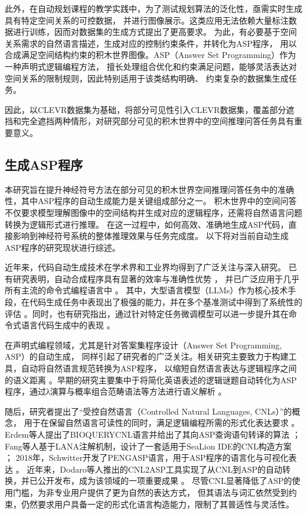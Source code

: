 此外，在自动规划课程的教学实践中，为了测试规划算法的泛化性，亟需实时生成具有特定空间关系的可控数据，
并进行图像展示。这类应用无法依赖大量标注数据进行训练，因而对数据集的生成方式提出了更高要求。
为此，有必要基于空间关系需求的自然语言描述，生成对应的控制约束条件，并转化为ASP程序，
用以合成满足空间结构约束的积木世界图像。ASP（Answer Set Programming）作为一种声明式逻辑编程方法，
擅长处理组合优化和约束满足问题，能够灵活表达对空间关系的限制规则，因此特别适用于该类结构明确、
约束复杂的数据集生成任务。

因此，以CLEVR数据集为基础，将部分可见性引入CLEVR数据集，覆盖部分遮挡和完全遮挡两种情形，对研究部分可见的积木世界中的空间推理问答任务具有重要意义。
\subsection{生成ASP程序}
本研究旨在提升神经符号方法在部分可见的积木世界空间推理问答任务中的准确性，其中ASP程序的自动生成能力是关键组成部分之一。
积木世界中的空间问答不仅要求模型理解图像中的空间结构并生成对应的逻辑程序，还需将自然语言问题转换为逻辑形式进行推理。
在这一过程中，如何高效、准确地生成ASP代码，直接影响到神经符号系统的整体推理效果与任务完成度。
以下将对当前自动生成ASP程序的研究现状进行综述。

近年来，代码自动生成技术在学术界和工业界均得到了广泛关注与深入研究。
已有研究表明，自动合成程序具有显著的效率与准确性优势 \cite{ernst2022ai}\cite{peng2023impact}\cite{dakhel2023github}，
并已广泛应用于几乎所有主流的命令式编程语言中 \cite{chen2021evaluating}。
其中，大型语言模型（LLMs）作为核心技术手段，在代码生成任务中表现出了极强的能力，并在多个基准测试中得到了系统性的评估 \cite{xu2022systematic}\cite{wang2023codet5+}。同时，也有研究指出，通过针对特定任务微调模型可以进一步提升其在命令式语言代码生成中的表现 \cite{ma2024llamoco}。

在声明式编程领域，尤其是针对答案集程序设计（Answer Set Programming, ASP）的自动生成，
同样引起了研究者的广泛关注。相关研究主要致力于构建工具，自动将自然语言规范转换为ASP程序，
以缩短自然语言表达与逻辑程序之间的语义距离 \cite{erdem2009transforming}\cite{fang2017approach}\cite{schwitter2018specifying}\cite{caruso2024cnl2asp}。早期的研究主要集中于将简化英语表述的逻辑谜题自动转化为ASP程序，通过λ演算与概率组合范畴语法等方法进行语义解析 \cite{baral2012solving}。

随后，研究者提出了“受控自然语言（Controlled Natural Languages, CNLs）”的概念，
用于在保留自然语言可读性的同时，满足逻辑编程所需的形式化表达要求 \cite{kuhn2014survey}。
Erdem等人提出了BIOQUERYCNL语言并给出了其向ASP查询语句转译的算法 \cite{erdem2009transforming}；
Fang等人基于LANA注解机制，设计了一套适用于SeaLion IDE的CNL构造方案 \cite{fang2017approach}；
2018年，Schwitter开发了PENGASP语言，用于ASP程序的语言化与可视化表达 \cite{schwitter2018specifying}。
近年来，Dodaro等人推出的CNL2ASP工具实现了从CNL到ASP的自动转换，并已公开发布，成为该领域的一项重要成果 \cite{caruso2024cnl2asp}。
尽管CNL显著降低了ASP的使用门槛，为非专业用户提供了更为自然的表达方式，
但其语法与词汇依然受到约束，仍然要求用户具备一定的形式化语言构造能力，限制了其普适性与灵活性。


